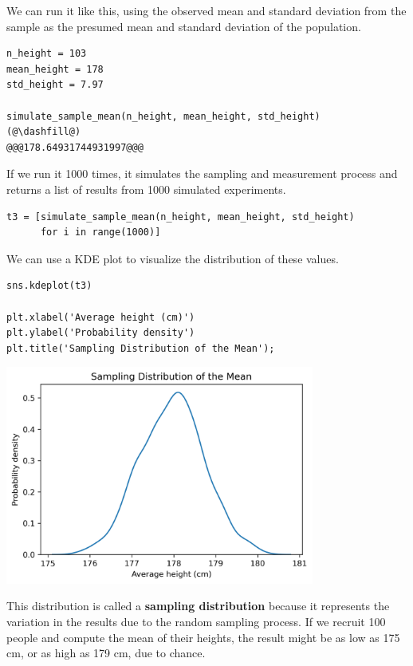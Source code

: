 We can run it like this, using the observed mean and standard deviation
from the sample as the presumed mean and standard deviation of the
population.

\begin{lstlisting}[]
n_height = 103
mean_height = 178
std_height = 7.97

simulate_sample_mean(n_height, mean_height, std_height)
(@\dashfill@)
@@@178.64931744931997@@@
\end{lstlisting}

If we run it 1000 times, it simulates the sampling and measurement
process and returns a list of results from 1000 simulated experiments.

\begin{lstlisting}[]
t3 = [simulate_sample_mean(n_height, mean_height, std_height)
      for i in range(1000)]
\end{lstlisting}

We can use a KDE plot to visualize the distribution of these values.

\begin{lstlisting}[]
sns.kdeplot(t3)

plt.xlabel('Average height (cm)')
plt.ylabel('Probability density')
plt.title('Sampling Distribution of the Mean');
\end{lstlisting}

\begin{center}
\includegraphics[width=4in]{chapters/11_resampling_files/11_resampling_59_0.png}
\end{center}

This distribution is called a \textbf{sampling distribution} because it
represents the variation in the results due to the random sampling
process. If we recruit 100 people and compute the mean of their heights,
the result might be as low as 175 cm, or as high as 179 cm, due to
chance.

